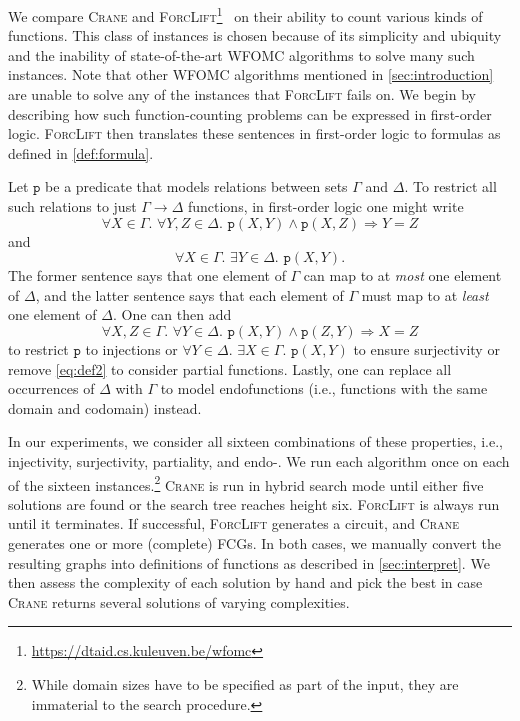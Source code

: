 \documentclass{article}
\theoremstyle{definition}
\theoremstyle{remark}
\begin{document}
We compare \textsc{Crane} and
\textsc{ForcLift}\footnote{\url{https://dtaid.cs.kuleuven.be/wfomc}}~\cite{DBLP:conf/ijcai/BroeckTMDR11}
on their ability to count various kinds of functions. This class of instances is
chosen because of its simplicity and ubiquity and the inability of
state-of-the-art WFOMC algorithms to solve many such instances. Note that other
WFOMC algorithms mentioned in \cref{sec:introduction} are unable to solve any of
the instances that \textsc{ForcLift} fails on. We begin by describing how such
function-counting problems can be expressed in first-order logic.
\textsc{ForcLift} then translates these sentences in first-order logic to
formulas as defined in \cref{def:formula}.

Let $\texttt{p}$ be a predicate that models relations between sets $\Gamma$ and
$\Delta$. To restrict all such relations to just $\Gamma \to \Delta$ functions,
in first-order logic one might write
\[
  \forall X \in \Gamma\text{. }\forall Y,Z \in \Delta\text{. }\texttt{p}(X, Y) \land \texttt{p}(X, Z) \Rightarrow Y = Z
\]
and
\begin{equation}\label{eq:def2}
  \forall X \in \Gamma\text{. }\exists Y \in \Delta\text{. }\texttt{p}(X, Y).
\end{equation}
The former sentence says that one element of $\Gamma$ can map to at \emph{most}
one element of $\Delta$, and the latter sentence says that each element of
$\Gamma$ must map to at \emph{least} one element of $\Delta$. One can then add
\[
  \forall X,Z \in \Gamma\text{. }\forall Y \in \Delta\text{. }\texttt{p}(X, Y) \land \texttt{p}(Z, Y) \Rightarrow X = Z
\]
to restrict $\texttt{p}$ to injections or
  $\forall Y \in \Delta\text{. }\exists X \in \Gamma\text{. }\texttt{p}(X, Y)$
to ensure surjectivity or remove \cref{eq:def2} to consider partial functions.
Lastly, one can replace all occurrences of $\Delta$ with $\Gamma$ to model
endofunctions (i.e., functions with the same domain and codomain) instead.

In our experiments, we consider all sixteen combinations of these properties,
i.e., injectivity, surjectivity, partiality, and endo-. We run each algorithm
once on each of the sixteen instances.\footnote{While domain sizes have to be
  specified as part of the input, they are immaterial to the search procedure.}
\textsc{Crane} is run in hybrid search mode until either five solutions are
found or the search tree reaches height six. \textsc{ForcLift} is always run
until it terminates. If successful, \textsc{ForcLift} generates a circuit, and
\textsc{Crane} generates one or more (complete) FCGs. In both cases, we manually
convert the resulting graphs into definitions of functions as described in
\cref{sec:interpret}. We then assess the complexity of each solution by hand and
pick the best in case \textsc{Crane} returns several solutions of varying
complexities.
\end{document}

